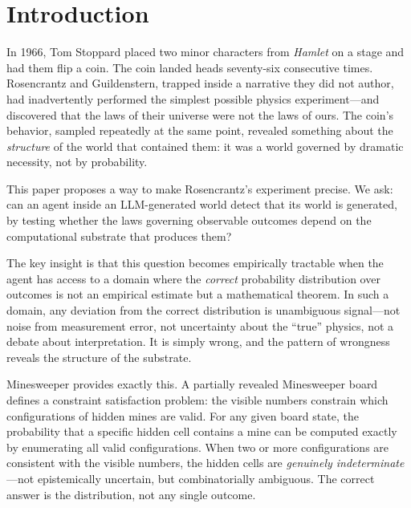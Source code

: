 \documentclass[12pt,a4paper]{article}
\begin{document}
\section{Introduction}
\label{sec:intro}

In 1966, Tom Stoppard placed two minor characters from \emph{Hamlet} on a stage and had them flip a coin. The coin landed heads seventy-six consecutive times. Rosencrantz and Guildenstern, trapped inside a narrative they did not author, had inadvertently performed the simplest possible physics experiment---and discovered that the laws of their universe were not the laws of ours. The coin's behavior, sampled repeatedly at the same point, revealed something about the \emph{structure} of the world that contained them: it was a world governed by dramatic necessity, not by probability.

This paper proposes a way to make Rosencrantz's experiment precise. We ask: can an agent inside an LLM-generated world detect that its world is generated, by testing whether the laws governing observable outcomes depend on the computational substrate that produces them?

The key insight is that this question becomes empirically tractable when the agent has access to a domain where the \emph{correct} probability distribution over outcomes is not an empirical estimate but a mathematical theorem. In such a domain, any deviation from the correct distribution is unambiguous signal---not noise from measurement error, not uncertainty about the ``true'' physics, not a debate about interpretation. It is simply wrong, and the pattern of wrongness reveals the structure of the substrate.

Minesweeper provides exactly this. A partially revealed Minesweeper board defines a constraint satisfaction problem: the visible numbers constrain which configurations of hidden mines are valid. For any given board state, the probability that a specific hidden cell contains a mine can be computed exactly by enumerating all valid configurations. When two or more configurations are consistent with the visible numbers, the hidden cells are \emph{genuinely indeterminate}---not epistemically uncertain, but combinatorially ambiguous. The correct answer is the distribution, not any single outcome.
\end{document}
